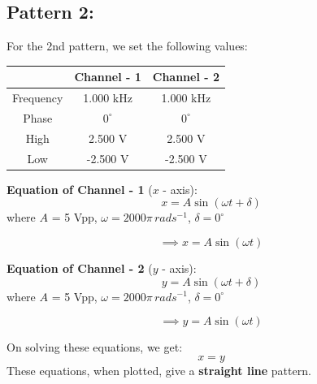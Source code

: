 \documentclass[12pt]{article}
\begin{document}
\subsection{Pattern 2:}
For the 2nd pattern, we set the following values:
\begin{table}[H]
    \centering
    \begin{tabular}{|c|c|c|}
    \hline
        & \textbf{Channel - 1} & \textbf{Channel - 2}\\
    \hline
    Frequency & 1.000 kHz & 1.000 kHz\\
    \hline
    Phase     & $0^{\circ}$ & $0^{\circ}$\\
    \hline
    High      & 2.500 V & 2.500 V\\
    \hline
    Low       & -2.500 V & -2.500 V\\
    \hline
    \end{tabular}
\end{table}

\textbf{Equation of Channel - 1} ($x$ - axis):
\[
x = A \sin{\left(\omega t + \delta\right)}
\]
where $A$ = 5 Vpp, $\omega = 2000 \pi \, rad s^{-1}$, $\delta = 0^{\circ}$

\[
\implies x = A \sin{\left(\omega t\right)}
\]

\textbf{Equation of Channel - 2} ($y$ - axis):
\[
y = A \sin{\left(\omega t + \delta\right)}
\]
where $A$ = 5 Vpp, $\omega = 2000 \pi \, rad s^{-1}$, $\delta = 0^{\circ}$

\[
\implies y = A \sin{\left(\omega t\right)}
\]

On solving these equations, we get:
\[
x = y
\]
These equations, when plotted, give a \textbf{straight line} pattern.
\end{document}
